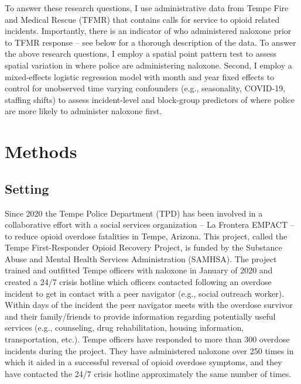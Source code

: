 To answer these research questions, I use administrative data from Tempe Fire and Medical Rescue (TFMR) that contains calls for service to opioid related incidents. Importantly, there is an indicator of who administered naloxone prior to TFMR response -- see below for a thorough description of the data. To answer the above research questions, I employ a spatial point pattern test to assess spatial variation in where police are administering naloxone. Second, I employ a mixed-effects logistic regression model with month and year fixed effects to control for unobserved time varying confounders (e.g., seasonality, COVID-19, staffing shifts) to assess incident-level and block-group predictors of where police are more likely to administer naloxone first.

\section{Methods}
\subsection{Setting}

Since 2020 the Tempe Police Department (TPD) has been involved in a collaborative effort with a social services organization – La Frontera EMPACT – to reduce opioid overdose fatalities in Tempe, Arizona. This project, called the Tempe First-Responder Opioid Recovery Project, is funded by the Substance Abuse and Mental Health Services Administration (SAMHSA). The project trained and outfitted Tempe officers with naloxone in January of 2020 and created a 24/7 crisis hotline which officers contacted following an overdose incident to get in contact with a peer navigator (e.g., social outreach worker). Within days of the incident the peer navigator meets with the overdose survivor and their family/friends to provide information regarding potentially useful services (e.g., counseling, drug rehabilitation, housing information, transportation, etc.). Tempe officers have responded to more than 300 overdose incidents during the project. They have administered naloxone over 250 times in which it aided in a successful reversal of opioid overdose symptoms, and they have contacted the 24/7 crisis hotline approximately the same number of times. 

